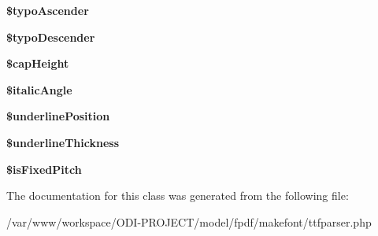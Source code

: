 \begin{DoxyCompactItemize}
\item 
{\bfseries \$typo\+Ascender}\label{class_t_t_f_parser_aac1d153a157f6f2cadc5b4e0c1b649f6}

\item 
{\bfseries \$typo\+Descender}\label{class_t_t_f_parser_a4f74a35619af3d9cf4f454f857c94c04}

\item 
{\bfseries \$cap\+Height}\label{class_t_t_f_parser_a76a3a7373f3fe99c1af7c0d093ab76ae}

\item 
{\bfseries \$italic\+Angle}\label{class_t_t_f_parser_a72fbc7c35fba52f236a721c63712eaf2}

\item 
{\bfseries \$underline\+Position}\label{class_t_t_f_parser_a860e3b1a3a6c97c90e3d9a317ff906d8}

\item 
{\bfseries \$underline\+Thickness}\label{class_t_t_f_parser_a1a12043e303f592fb5c256f92acadaf2}

\item 
{\bfseries \$is\+Fixed\+Pitch}\label{class_t_t_f_parser_abe804406e76e85264e142b05c1ca9d12}

\end{DoxyCompactItemize}


The documentation for this class was generated from the following file\+:\begin{DoxyCompactItemize}
\item 
/var/www/workspace/\+O\+D\+I-\/\+P\+R\+O\+J\+E\+C\+T/model/fpdf/makefont/ttfparser.\+php\end{DoxyCompactItemize}
